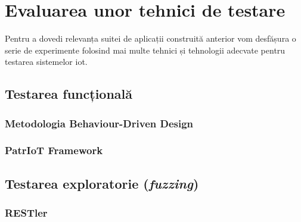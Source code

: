 \chapter{Evaluarea unor tehnici de testare}

Pentru a dovedi relevanța suitei de aplicații construită anterior vom desfășura o serie de experimente folosind mai multe tehnici și tehnologii adecvate pentru testarea sistemelor \acrshort{iot}. 


\section{Testarea funcțională}


\subsection{Metodologia Behaviour-Driven Design}


\subsection{PatrIoT Framework}


\section{Testarea exploratorie (\emph{fuzzing})}


\subsection{RESTler}



